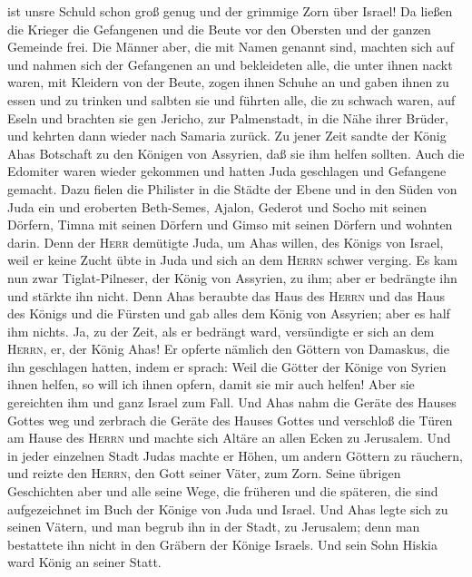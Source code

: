 ist unsre Schuld schon groß genug und der grimmige Zorn über Israel!
 Da ließen die Krieger die Gefangenen und die Beute vor
den Obersten und der ganzen Gemeinde frei.  Die Männer
aber, die mit Namen genannt sind, machten sich auf und nahmen sich der
Gefangenen an und bekleideten alle, die unter ihnen nackt waren, mit
Kleidern von der Beute, zogen ihnen Schuhe an und gaben ihnen zu essen
und zu trinken und salbten sie und führten alle, die zu schwach waren,
auf Eseln und brachten sie gen Jericho, zur Palmenstadt, in die Nähe
ihrer Brüder, und kehrten dann wieder nach Samaria zurück.
 Zu jener Zeit sandte der König Ahas Botschaft zu den
Königen von Assyrien, daß sie ihm helfen sollten.  Auch
die Edomiter waren wieder gekommen und hatten Juda geschlagen und
Gefangene gemacht.  Dazu fielen die Philister in die
Städte der Ebene und in den Süden von Juda ein und eroberten Beth-Semes,
Ajalon, Gederot und Socho mit seinen Dörfern, Timna mit seinen Dörfern
und Gimso mit seinen Dörfern und wohnten darin.  Denn der
\textsc{Herr} demütigte Juda, um Ahas willen, des Königs von Israel,
weil er keine Zucht übte in Juda und sich an dem \textsc{Herrn} schwer
verging.  Es kam nun zwar Tiglat-Pilneser, der König von
Assyrien, zu ihm; aber er bedrängte ihn und stärkte ihn nicht.
 Denn Ahas beraubte das Haus des \textsc{Herrn} und das
Haus des Königs und die Fürsten und gab alles dem König von Assyrien;
aber es half ihm nichts.  Ja, zu der Zeit, als er
bedrängt ward, versündigte er sich an dem \textsc{Herrn}, er, der König
Ahas!  Er opferte nämlich den Göttern von Damaskus, die
ihn geschlagen hatten, indem er sprach: Weil die Götter der Könige von
Syrien ihnen helfen, so will ich ihnen opfern, damit sie mir auch
helfen! Aber sie gereichten ihm und ganz Israel zum Fall.
 Und Ahas nahm die Geräte des Hauses Gottes weg und
zerbrach die Geräte des Hauses Gottes und verschloß die Türen am Hause
des \textsc{Herrn} und machte sich Altäre an allen Ecken zu Jerusalem.
 Und in jeder einzelnen Stadt Judas machte er Höhen, um
andern Göttern zu räuchern, und reizte den \textsc{Herrn}, den Gott
seiner Väter, zum Zorn.  Seine übrigen Geschichten aber
und alle seine Wege, die früheren und die späteren, die sind
aufgezeichnet im Buch der Könige von Juda und Israel. 
Und Ahas legte sich zu seinen Vätern, und man begrub ihn in der Stadt,
zu Jerusalem; denn man bestattete ihn nicht in den Gräbern der Könige
Israels. Und sein Sohn Hiskia ward König an seiner Statt.

